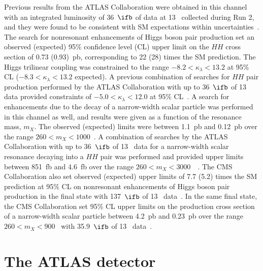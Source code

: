 \documentclass[PAPER, cernpreprint, texlive=2016, paper=a4, USenglish, texmf]{atlasdoc}
\begin{document}
Previous results from the ATLAS Collaboration were obtained in this channel with an integrated luminosity of 36~$\ifb$ of data at 13~\TeV{} collected during Run 2, and they were found to be consistent with SM expectations within uncertainties~\cite{HIGG-2016-15}. The search for nonresonant enhancements of Higgs boson pair production set an observed (expected) 95\% confidence level (CL) upper limit on the $HH$ cross section of 0.73 (0.93)~pb, corresponding to 22 (28) times the SM prediction. The Higgs trilinear coupling was constrained to the range $-8.2 < \kappa_\lambda < 13.2$ at 95\% CL ($-8.3 < \kappa_\lambda < 13.2$ expected). A previous combination of searches for $HH$ pair production performed by  the ATLAS Collaboration with up to 36~$\ifb$ of 13~\TeV{} data provided constraints of $-5.0 < \kappa_\lambda < 12.0$ at 95\% CL~\cite{HDBS-2018-58}.
A search for enhancements due to the decay of a narrow-width scalar particle was performed in this channel as well, and results were given as a function of the resonance mass, $m_X$. The observed (expected) limits were between 1.1~pb and 0.12~pb over the range $260 < m_X < 1000$~\GeV.  A combination of searches  by  the ATLAS Collaboration with up to 36~$\ifb$ of 13~\TeV{} data for a narrow-width scalar resonance decaying into a $HH$ pair was performed and provided upper limits between 851~fb and 4.6~fb over the range $260 < m_X < 3000$~\GeV~\cite{HDBS-2018-58}.
The CMS Collaboration also set observed (expected) upper limits of 7.7 (5.2) times the SM prediction at 95\% CL on nonresonant enhancements of Higgs boson pair production in the \yybb{} final state with 137~$\ifb$ of 13~\TeV{} data~\cite{CMS-HIG-19-018}. In the same final state, the CMS Collaboration set 95\% CL upper limits on the production cross section of a narrow-width scalar particle between 4.2~pb and 0.23~pb over the range $260 < m_X < 900$~\GeV{} with 35.9~$\ifb$ of 13~\TeV{} data~\cite{CMS-HIG-17-008}.
 
 
 
 
 
 
 
 
 
 
 
\section{The ATLAS detector}
 
\end{document}
